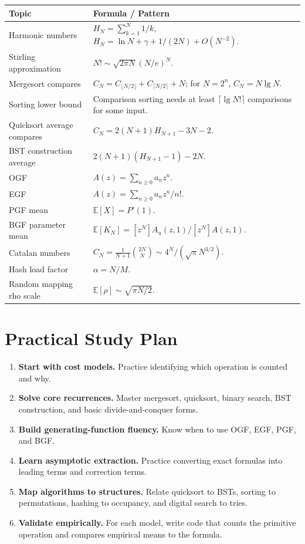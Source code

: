 \documentclass[11pt]{article}
\newcommand{\E}{\mathbb{E}}
\begin{document}
\begin{center}
\begin{tabularx}{\textwidth}{L{0.28\textwidth} Y}
\toprule
\textbf{Topic} & \textbf{Formula / Pattern} \\
\midrule
Harmonic numbers & \(H_N=\sum_{k=1}^{N}1/k\), \quad \(H_N=\ln N+\gamma+1/(2N)+O(N^{-2})\). \\
Stirling approximation & \(N!\sim\sqrt{2\pi N}(N/e)^N\). \\
Mergesort compares & \(C_N=C_{\lfloor N/2\rfloor}+C_{\lceil N/2\rceil}+N\); for \(N=2^n\), \(C_N=N\lg N\). \\
Sorting lower bound & Comparison sorting needs at least \(\lceil \lg N!\rceil\) comparisons for some input. \\
Quicksort average compares & \(C_N=2(N+1)H_{N+1}-3N-2\). \\
BST construction average & \(2(N+1)(H_{N+1}-1)-2N\). \\
OGF & \(A(z)=\sum_{n\ge0}a_nz^n\). \\
EGF & \(A(z)=\sum_{n\ge0}a_nz^n/n!\). \\
PGF mean & \(\E[X]=P'(1)\). \\
BGF parameter mean & \(\E[K_N]=[z^N]A_u(z,1)/[z^N]A(z,1)\). \\
Catalan numbers & \(C_N=\frac{1}{N+1}\binom{2N}{N}\sim 4^N/(\sqrt{\pi}N^{3/2})\). \\
Hash load factor & \(\alpha=N/M\). \\
Random mapping rho scale & \(\E[\rho]\sim\sqrt{\pi N/2}\). \\
\bottomrule
\end{tabularx}
\end{center}

\section{Practical Study Plan}

\begin{enumerate}
  \item \textbf{Start with cost models.} Practice identifying which operation is counted and why.
  \item \textbf{Solve core recurrences.} Master mergesort, quicksort, binary search, BST construction, and basic divide-and-conquer forms.
  \item \textbf{Build generating-function fluency.} Know when to use OGF, EGF, PGF, and BGF.
  \item \textbf{Learn asymptotic extraction.} Practice converting exact formulas into leading terms and correction terms.
  \item \textbf{Map algorithms to structures.} Relate quicksort to BSTs, sorting to permutations, hashing to occupancy, and digital search to tries.
  \item \textbf{Validate empirically.} For each model, write code that counts the primitive operation and compares empirical means to the formula.
\end{enumerate}
\end{document}
